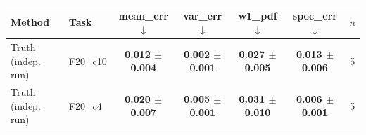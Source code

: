 \begin{tabular}{llccccc}
\toprule
Method & Task & mean\_err $\downarrow$ & var\_err $\downarrow$ & w1\_pdf $\downarrow$ & spec\_err $\downarrow$ & $n$ \\
\midrule
Truth (indep. run) & F20\_c10 & \textbf{0.012 $\pm$ 0.004} & \textbf{0.002 $\pm$ 0.001} & \textbf{0.027 $\pm$ 0.005} & \textbf{0.013 $\pm$ 0.006} & 5 \\
\midrule
Truth (indep. run) & F20\_c4 & \textbf{0.020 $\pm$ 0.007} & \textbf{0.005 $\pm$ 0.001} & \textbf{0.031 $\pm$ 0.010} & \textbf{0.006 $\pm$ 0.001} & 5 \\
\bottomrule
\end{tabular}
